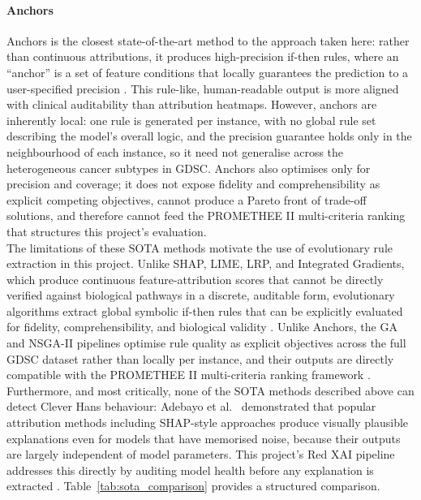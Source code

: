 \paragraph{Anchors}
Anchors is the closest state-of-the-art method to the approach taken here: rather than continuous
attributions, it produces high-precision if-then rules, where an ``anchor'' is a set of feature
conditions that locally guarantees the prediction to a user-specified precision \cite{Ribeiro2018}. This
rule-like, human-readable output is more aligned with clinical auditability than attribution heatmaps.
However, anchors are inherently local: one rule is generated per instance, with no global rule set
describing the model's overall logic, and the precision guarantee holds only in the neighbourhood of
each instance, so it need not generalise across the heterogeneous cancer subtypes in GDSC. Anchors also
optimises only for precision and coverage; it does not expose fidelity and comprehensibility as explicit
competing objectives, cannot produce a Pareto front of trade-off solutions, and therefore cannot feed
the PROMETHEE II multi-criteria ranking that structures this project's evaluation.
\\
The limitations of these SOTA methods motivate the use of evolutionary rule extraction in this project.
Unlike SHAP, LIME, LRP, and Integrated Gradients, which produce continuous feature-attribution scores
that cannot be directly verified against biological pathways in a discrete, auditable form, evolutionary
algorithms extract global symbolic if-then rules that can be explicitly evaluated for fidelity,
comprehensibility, and biological validity \cite{Yedjour2024}. Unlike Anchors, the GA and NSGA-II
pipelines optimise rule quality as explicit objectives across the full GDSC dataset rather than locally
per instance, and their outputs are directly compatible with the PROMETHEE II multi-criteria ranking
framework \cite{Yedjour2024}. Furthermore, and most critically, none of the SOTA methods described above
can detect Clever Hans behaviour: Adebayo et al.~\cite{Adebayo2018} demonstrated that popular attribution
methods including SHAP-style approaches produce visually plausible explanations even for models that have
memorised noise, because their outputs are largely independent of model parameters. This project's Red
XAI pipeline addresses this directly by auditing model health before any explanation is extracted
\cite{Biecek2024}. Table~\ref{tab:sota_comparison} provides a structured comparison.

